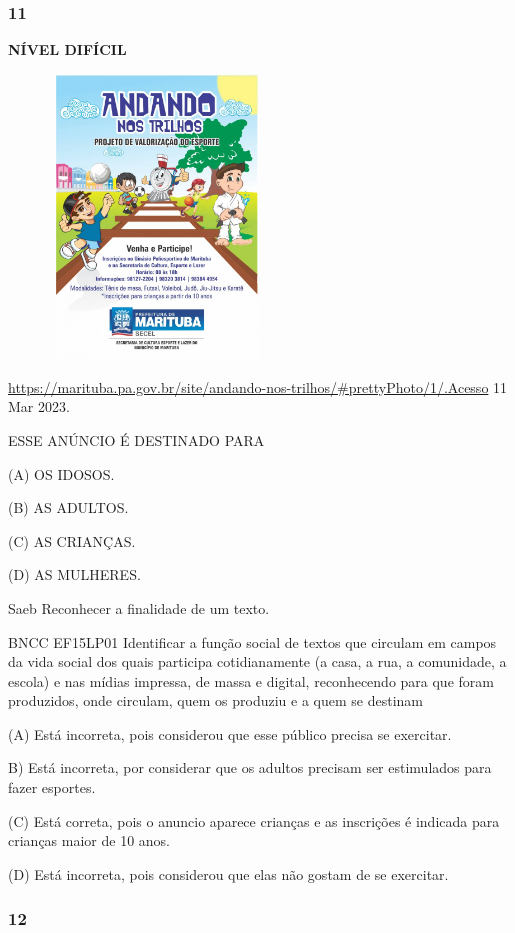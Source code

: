 \subsubsection{11}\label{section-137}

\textbf{NÍVEL DIFÍCIL}

\includegraphics[width=3.11515in,height=2.97237in]{media/image170.jpeg}

\url{https://marituba.pa.gov.br/site/andando-nos-trilhos/\#prettyPhoto/1/.Acesso}
11 Mar 2023.

ESSE ANÚNCIO É DESTINADO PARA

(A) OS IDOSOS.

(B) AS ADULTOS.

(C) AS CRIANÇAS.

(D) AS MULHERES.

Saeb Reconhecer a finalidade de um texto.

BNCC EF15LP01 Identificar a função social de textos que circulam em
campos da vida social dos quais participa cotidianamente (a casa, a rua,
a comunidade, a escola) e nas mídias impressa, de massa e digital,
reconhecendo para que foram produzidos, onde circulam, quem os produziu
e a quem se destinam

(A) Está incorreta, pois considerou que esse público precisa se
exercitar.

B) Está incorreta, por considerar que os adultos precisam ser
estimulados para fazer esportes.

(C) Está correta, pois o anuncio aparece crianças e as inscrições é
indicada para crianças maior de 10 anos.

(D) Está incorreta, pois considerou que elas não gostam de se exercitar.

\subsubsection{12}\label{section-138}

